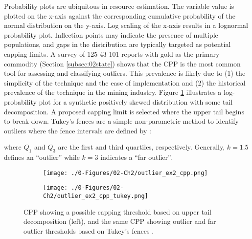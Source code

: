 Probability plots are ubiquitous in resource estimation. The variable value is plotted on the x-axis against the corresponding cumulative probability of the normal distribution on the y-axis. Log scaling of the x-axis results in a lognormal probability plot. Inflection points may indicate the presence of multiple populations, and gaps in the distribution are typically targeted as potential capping limits. A survey of 125 43-101 reports with gold as the primary commodity (Section \ref{subsec:02state}) shows that the \gls{CPP} is the most common tool for assessing and classifying outliers. This prevalence is likely due to (1) the simplicity of the technique and the ease of implementation and (2) the historical prevalence of the technique in the mining industry. Figure \ref{fig:cpp} illustrates a log-probability plot for a synthetic positively skewed distribution with some tail decomposition. A proposed capping limit is selected where the upper tail begins to break down. Tukey's fences are a simple non-parametric method to identify outliers where the fence intervals are defined by \citep{tukey1977exploratory}:
\begin{equation}
    [Q_{1}-k(Q_{3}-Q_{1})), Q_{3}+k(Q_{3}-Q_{1}))]
    \label{eq:tukey}
\end{equation}

\lowercase{Where} $Q_{1}$ and $Q_{3}$ are the first and third quartiles, respectively. Generally, $k=1.5$ defines an ``outlier'' while $k=3$ indicates a ``far outlier''.

\begin{figure}[!htb]
    \begin{subfigure}{0.5\textwidth}
        \centering
        \texttt{[image: ./0-Figures/02-Ch2/outlier\_ex2\_cpp.png]}
    \end{subfigure}
    \begin{subfigure}{0.5\textwidth}
        \centering
        \texttt{[image: ./0-Figures/02-Ch2/outlier\_ex2\_cpp\_tukey.png]}
    \end{subfigure}
    \caption{\gls{CPP} showing a possible capping threshold based on upper tail decomposition (left), and the same \gls{CPP} showing outlier and far outlier thresholds based on Tukey's fences \citep{tukey1977exploratory}.}
    \label{fig:cpp}
\end{figure}

